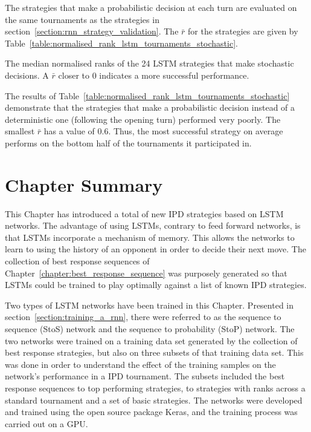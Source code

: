 The \lstmstrategies strategies that make a probabilistic decision at each turn
are evaluated on the same \metatournamentslstm tournaments as the strategies
in section~\ref{section:rnn_strategy_validation}. The \(\bar{r}\) for the
strategies are given by Table~\ref{table:normalised_rank_lstm_tournaments_stochastic}.

\begin{table}[!htbp]
    \begin{center}
    \resizebox{.9\textwidth}{!}{
        
    }
\end{center}
\caption{The median normalised ranks of the 24 LSTM strategies that make stochastic
decisions. A \(\bar{r}\) closer to 0 indicates a more successful performance.}
\label{table:normalised_rank_lstm_tournaments_stochastic}
\end{table}

The results of Table~\ref{table:normalised_rank_lstm_tournaments_stochastic}
demonstrate that the strategies that make a probabilistic decision instead of a
deterministic one (following the opening turn) performed very poorly. The
smallest \(\bar{r}\) has a value of 0.6. Thus, the most successful strategy on
average performs on the bottom half of the tournaments it participated in.

\section{Chapter Summary}

This Chapter has introduced a total of \lstmstrategies new IPD strategies based
on LSTM networks. The advantage of using LSTMs, contrary to feed forward networks,
is that LSTMs incorporate a mechanism of memory. This allows the networks
to learn to using the history of an opponent in order to decide their next move.
The collection of best response sequences of
Chapter~\ref{chapter:best_response_sequence} was purposely generated so that
LSTMs could be trained to play optimally against a list of known IPD strategies.

Two types of LSTM networks have been trained in this Chapter. Presented in
section~\ref{section:training_a_rnn}, there were referred to as the sequence to
sequence (StoS) network and the sequence to probability (StoP) network. The two
networks were trained on a training data set generated by the collection of best
response strategies, but also on three subsets of that training data set. This
was done in order to understand the effect of the training samples on the
network's performance in a IPD tournament. The subsets included the best
response sequences to top performing strategies, to strategies with ranks across
a standard tournament and a set of basic strategies. The networks were developed
and trained using the open source package Keras, and the training process was
carried out on a GPU.

